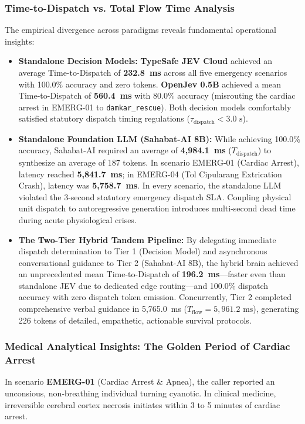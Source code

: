 \documentclass[journal,compsoc]{IEEEtran}
\begin{document}
\subsubsection{Time-to-Dispatch vs. Total Flow Time Analysis}
The empirical divergence across paradigms reveals fundamental operational insights:
\begin{itemize}
    \item \textbf{Standalone Decision Models:} \textbf{TypeSafe JEV Cloud} achieved an average Time-to-Dispatch of \textbf{232.8~ms} across all five emergency scenarios with 100.0\% accuracy and zero tokens. \textbf{OpenJev 0.5B} achieved a mean Time-to-Dispatch of \textbf{560.4~ms} with 80.0\% accuracy (misrouting the cardiac arrest in EMERG-01 to \texttt{damkar\_rescue}). Both decision models comfortably satisfied statutory dispatch timing regulations ($\tau_{\text{dispatch}} < 3.0 \text{ s}$).
    \item \textbf{Standalone Foundation LLM (Sahabat-AI 8B):} While achieving 100.0\% accuracy, Sahabat-AI required an average of \textbf{4,984.1~ms} ($T_{\text{dispatch}}$) to synthesize an average of 187 tokens. In scenario EMERG-01 (Cardiac Arrest), latency reached \textbf{5,841.7~ms}; in EMERG-04 (Tol Cipularang Extrication Crash), latency was \textbf{5,758.7~ms}. In every scenario, the standalone LLM violated the 3-second statutory emergency dispatch SLA. Coupling physical unit dispatch to autoregressive generation introduces multi-second dead time during acute physiological crises.
    \item \textbf{The Two-Tier Hybrid Tandem Pipeline:} By delegating immediate dispatch determination to Tier 1 (Decision Model) and asynchronous conversational guidance to Tier 2 (Sahabat-AI 8B), the hybrid brain achieved an unprecedented mean Time-to-Dispatch of \textbf{196.2~ms}—faster even than standalone JEV due to dedicated edge routing—and 100.0\% dispatch accuracy with zero dispatch token emission. Concurrently, Tier 2 completed comprehensive verbal guidance in 5,765.0~ms ($T_{\text{flow}} = 5{,}961.2 \text{ ms}$), generating 226 tokens of detailed, empathetic, actionable survival protocols.
\end{itemize}

\subsubsection{Medical Analytical Insights: The Golden Period of Cardiac Arrest}
In scenario \textbf{EMERG-01} (Cardiac Arrest \& Apnea), the caller reported an unconsious, non-breathing individual turning cyanotic. In clinical medicine, irreversible cerebral cortex necrosis initiates within 3 to 5 minutes of cardiac arrest. 
\end{document}
